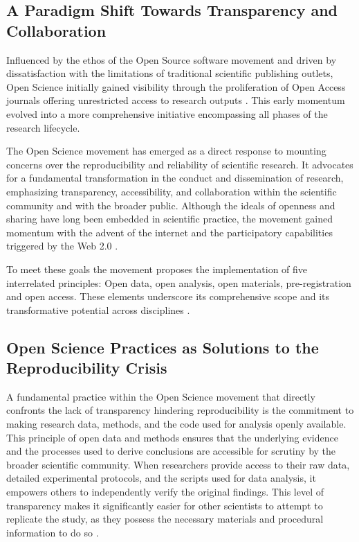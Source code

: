 \documentclass{article}
\begin{document}
\subsection{A Paradigm Shift Towards Transparency and Collaboration}

Influenced by the ethos of the Open Source software movement and driven by dissatisfaction with the limitations of traditional scientific publishing outlets, Open Science initially gained visibility through the proliferation of Open Access journals offering unrestricted access to research outputs \cite{laakso_anatomy_2012}. This early momentum evolved into a more comprehensive initiative encompassing all phases of the research lifecycle.

The Open Science movement has emerged as a direct response to mounting concerns over the reproducibility and reliability of scientific research. It advocates for a fundamental transformation in the conduct and dissemination of research, emphasizing transparency, accessibility, and collaboration within the scientific community and with the broader public. Although the ideals of openness and sharing have long been embedded in scientific practice, the movement gained momentum with the advent of the internet and the participatory capabilities triggered by the Web 2.0 \cite{thibault_open_2023}.

To meet these goals the movement proposes the implementation of five interrelated principles: Open data, open analysis, open materials, pre-registration and open access. These elements underscore its comprehensive scope and its transformative potential across disciplines \cite{van_dijk_open_2021}.

\subsection{Open Science Practices as Solutions to the Reproducibility Crisis}

A fundamental practice within the Open Science movement that directly confronts the lack of transparency hindering reproducibility is the commitment to making research data, methods, and the code used for analysis openly available. This principle of open data and methods ensures that the underlying evidence and the processes used to derive conclusions are accessible for scrutiny by the broader scientific community. When researchers provide access to their raw data, detailed experimental protocols, and the scripts used for data analysis, it empowers others to independently verify the original findings. This level of transparency makes it significantly easier for other scientists to attempt to replicate the study, as they possess the necessary materials and procedural information to do so \cite{van_dijk_open_2021}.
\end{document}
